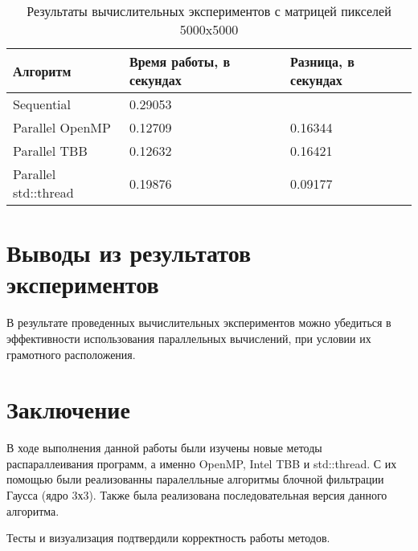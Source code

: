 \documentclass{report}
\begin{document}
\begin{table}[!ht]
\centering
\begin{tabular}{| p{5cm} | p{5cm} | p{5cm} |}
\hline
Алгоритм & Время работы, в секундах & Разница, в секундах  \\[5pt]
\hline
Sequential              & 0.29053       &  \\
Parallel OpenMP         & 0.12709       & 0.16344 \\
Parallel TBB            & 0.12632       & 0.16421 \\
Parallel std::thread    & 0.19876       & 0.09177 \\
\hline
\end{tabular}
\caption{Результаты вычислительных экспериментов с матрицей пикселей 5000x5000}
\end{table}
\newpage

\section*{Выводы из результатов экспериментов}
\par В результате проведенных вычислительных экспериментов можно убедиться в эффективности использования параллельных вычислений, при условии их грамотного расположения.
\newpage

\section*{Заключение}
\par В ходе выполнения данной работы были изучены новые методы распараллеивания программ, а именно OpenMP, Intel TBB и std::thread. С их помощью были реализованны паралелльные алгоритмы блочной фильтрации Гаусса (ядро 3х3). Также была реализована последовательная версия данного алгоритма.
\par Тесты и визуализация подтвердили корректность работы методов.
\newpage

\end{document}
